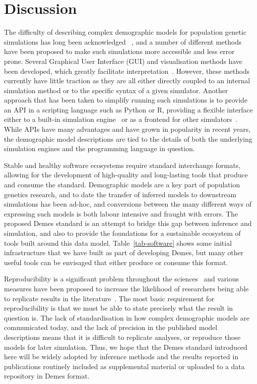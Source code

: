 \documentclass[11pt]{article}
\begin{document}
\section*{Discussion}

The difficulty of describing complex demographic models
for population genetic simulations has long been acknowledged
~\citep[][e.g.]{antao2007modeler4simcoal2}, %
and a number of different methods have been proposed to
make such simulations more accessible and less error prone.
Several Graphical User Interface (GUI) and visualisation
methods have been developed, which greatly facilitate
interpretation~\citep{mailund2005coasim,antao2007modeler4simcoal2,
ewing2010msms,zhou2018popdemog}. However, these methods
currently have little traction as they are all either directly coupled
to an internal simulation method or to the specific syntax
of a given simulator. Another approach that has been taken to
simplify running such simulations is to provide an API in a
scripting language such as Python or R, providing a flexible
interface either to a built-in simulation
engine~\citep{thornton2014cpp,kelleher2016efficient,haller2017flexible}
or as a frontend for other simulators~\citep{staab2016coala}.
While APIs have many advantages and have grown in popularity in
recent years, the demographic model descriptions are tied
to the details of both the underlying simulation engines
and the programming language in question.

Stable and healthy software ecosystems require standard interchange
formats, allowing for the development of high-quality and long-lasting
tools that produce and consume the standard.
Demographic models are a key part of population genetics research,
and to date the transfer of inferred models to downstream simulations
has been ad-hoc, and conversions between the many different ways
of expressing such models is both labour intensive and fraught with errors.
The proposed Demes standard is an attempt to bridge this gap
between inference and simulation, and also to provide the foundations
for a sustainable ecosystem of tools built around this data model.
Table~\ref{tab-software} shows some initial infrastructure that we have
built as part of developing Demes, but many other useful tools
can be envisaged that either produce or consume this format.

Reproducibility is a significant problem throughout the
sciences~\citep{baker20161} and various measures have been
proposed to increase the likelihood of researchers being
able to replicate results in the
literature~\citep{munafo2017manifesto}. The most basic requirement
for reproducibility is that we must be able to state precisely what
the result in question is. The lack of standardisation in how
complex demographic models are communicated today, and the lack of
precision in the published model descriptions means that it is difficult
to replicate analyses, or reproduce those models for later simulation.
Thus, we hope that the Demes standard introduced here will be widely adopted
by inference methods and the results reported in publications
routinely included as supplemental material or uploaded to a data
repository in Demes format.



\end{document}

